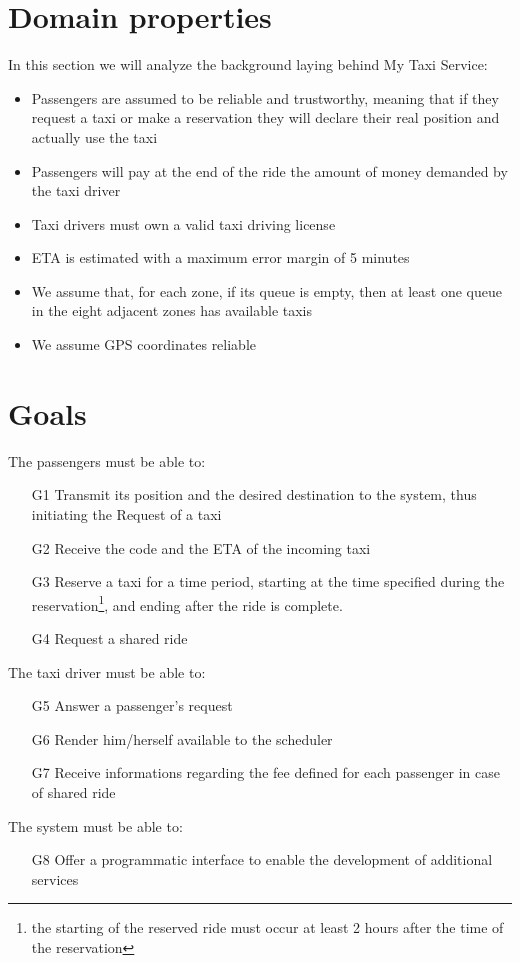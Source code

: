 \section{Domain properties}
In this section we will analyze the background laying behind My Taxi Service:
\begin{itemize}
  \item Passengers are assumed to be reliable and trustworthy, meaning that if they request a taxi or make a reservation
  they will declare their real position and actually use the taxi
  \item Passengers will pay at the end of the ride the amount of money demanded by the taxi driver
  \item Taxi drivers must own a valid taxi driving license
  \item ETA is estimated with a maximum error margin of 5 minutes
  \item We assume that, for each zone, if its queue is empty, then at least one queue in the eight adjacent zones has available taxis
  \item We assume GPS coordinates reliable
\end{itemize}
\section{Goals}
The passengers must be able to:
\begin{itemize}
  \item [G1] Transmit its position and the desired destination to the system, thus initiating the Request of a taxi
  \item [G2] Receive the code and the ETA of the incoming taxi
  \item [G3] Reserve a taxi for a time period, starting at the time specified during the reservation\footnote{the starting of the
  reserved ride must occur at least 2 hours after the time of the reservation}, and ending after the ride is complete.
  \item [G4] Request a shared ride
\end{itemize}
The taxi driver must be able to:
\begin{itemize}
  \item [G5] Answer a passenger's request
  \item [G6] Render him/herself available to the scheduler
  \item [G7] Receive informations regarding the fee defined for each passenger in case of shared ride
\end{itemize}
The system must be able to:
\begin{itemize}
  \item [G8] Offer a programmatic interface to enable the development of additional services
\end{itemize}



